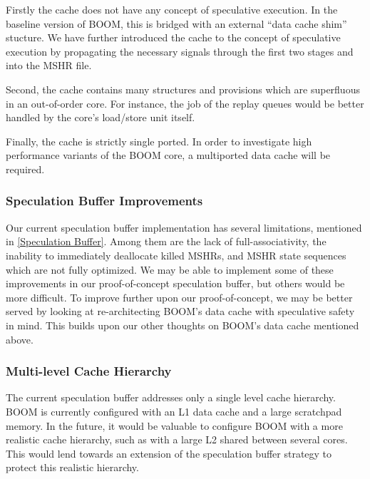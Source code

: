 Firstly the cache does not have any concept of speculative execution.
In the baseline version of BOOM, this is bridged with an external ``data cache shim'' stucture. We have further introduced the cache to the
concept of speculative execution by propagating the necessary signals through the first two stages and into the MSHR file.

Second, the cache contains many structures and provisions which are superfluous in an out-of-order core.
For instance, the job of the replay queues would be better handled by the core's load/store unit itself.

Finally, the cache is strictly single ported. In order to investigate high performance variants of the BOOM core,
a multiported data cache will be required.

\subsubsection{Speculation Buffer Improvements}
Our current speculation buffer implementation has several limitations, mentioned in \ref{Speculation Buffer}.
Among them are the lack of full-associativity, the inability to immediately deallocate killed MSHRs, and MSHR state sequences which are not fully optimized.
We may be able to implement some of these improvements in our proof-of-concept speculation buffer, but others would be more difficult. To improve further upon
our proof-of-concept, we may be better served by looking at re-architecting BOOM's data cache with speculative safety in mind. This builds upon our other thoughts
on BOOM's data cache mentioned above.

\subsubsection{Multi-level Cache Hierarchy}
The current speculation buffer addresses only a single level cache hierarchy.
BOOM is currently configured with an L1 data cache and a large scratchpad memory.
In the future, it would be valuable to configure BOOM with a more realistic cache hierarchy,
such as with a large L2 shared between several cores. This would lend towards an extension of the speculation
buffer strategy to protect this realistic hierarchy.
